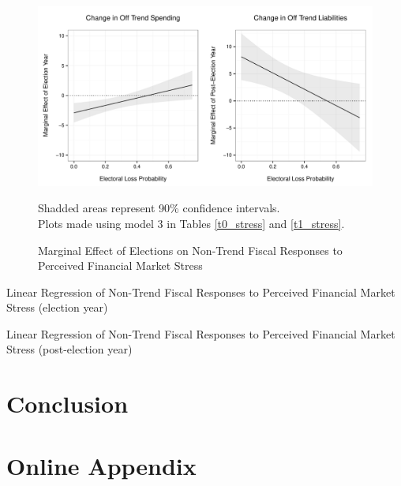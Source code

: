 \documentclass[]{article}
\begin{document}
\begin{figure}
    \caption{Marginal Effect of Elections on Non-Trend Fiscal Responses to Perceived Financial Market Stress}
    \label{me_stress}

    \begin{center}
        \includegraphics[scale=0.7]{analysis/figures/me_stress.pdf}
    \end{center}

    {\scriptsize{Shadded areas represent 90\% confidence intervals. \\
    Plots made using model 3 in Tables \ref{t0_stress} and \ref{t1_stress}.}}

\end{figure}

\begin{table}
    \caption{Linear Regression of Non-Trend Fiscal Responses to Perceived Financial Market Stress (election year)}
    \label{t0_stress}

    \begin{center}
        
    \end{center}

\end{table}

\begin{table}
    \caption{Linear Regression of Non-Trend Fiscal Responses to Perceived Financial Market Stress (post-election year)}
    \label{t1_stress}

    \begin{center}
        
    \end{center}

\end{table}


\section*{Conclusion}







\section{Online Appendix}


\end{document}
